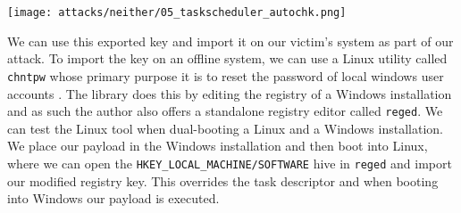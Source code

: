 \texttt{[image: attacks/neither/05\_taskscheduler\_autochk.png]}



We can use this exported key and import it on our victim's system as part of our attack. To import the key on an offline system, we can use a Linux utility called \lstinline{chntpw} whose primary purpose it is to reset the password of local windows user accounts \cite{chntpw}. The library does this by editing the registry of a Windows installation and as such the author also offers a standalone registry editor called \lstinline{reged}.
We can test the Linux tool when dual-booting a Linux and a Windows installation. We place our payload in the Windows installation and then boot into Linux, where we can open the \lstinline{HKEY_LOCAL_MACHINE/SOFTWARE} hive in \lstinline{reged} and import our modified registry key.
This overrides the task descriptor and when booting into Windows our payload is executed.

